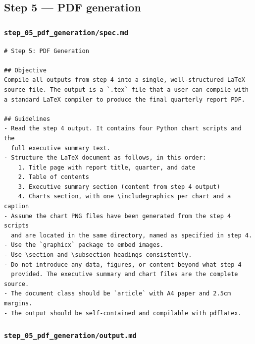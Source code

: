 \documentclass[12pt, a4paper]{article}
\begin{document}
\subsection{Step 5 --- PDF generation}

\subsubsection{\texttt{step\_05\_pdf\_generation/spec.md}}

\begin{lstlisting}[language={}]
# Step 5: PDF Generation

## Objective
Compile all outputs from step 4 into a single, well-structured LaTeX
source file. The output is a `.tex` file that a user can compile with
a standard LaTeX compiler to produce the final quarterly report PDF.

## Guidelines
- Read the step 4 output. It contains four Python chart scripts and the
  full executive summary text.
- Structure the LaTeX document as follows, in this order:
    1. Title page with report title, quarter, and date
    2. Table of contents
    3. Executive summary section (content from step 4 output)
    4. Charts section, with one \includegraphics per chart and a caption
- Assume the chart PNG files have been generated from the step 4 scripts
  and are located in the same directory, named as specified in step 4.
- Use the `graphicx` package to embed images.
- Use \section and \subsection headings consistently.
- Do not introduce any data, figures, or content beyond what step 4
  provided. The executive summary and chart files are the complete source.
- The document class should be `article` with A4 paper and 2.5cm margins.
- The output should be self-contained and compilable with pdflatex.
\end{lstlisting}

\subsubsection{\texttt{step\_05\_pdf\_generation/output.md}}
\end{document}
